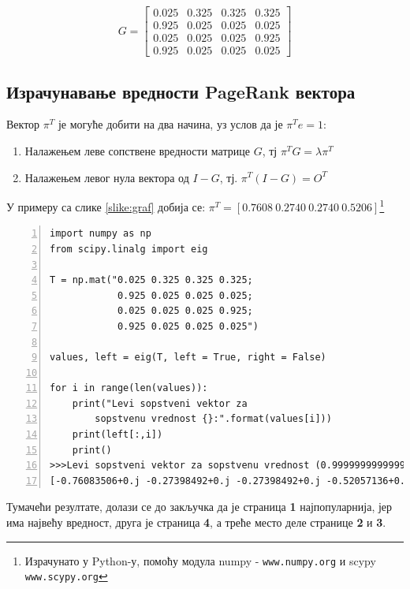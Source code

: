 \[G =
\begin{bmatrix}
0.025 & 0.325 & 0.325 & 0.325 \\
0.925 & 0.025 & 0.025 & 0.025 \\
0.025 & 0.025 & 0.025 & 0.925 \\
0.925 & 0.025 & 0.025 & 0.025
\end{bmatrix}
\]

\subsection{Израчунавање вредности PageRank\texttrademark{} вектора}

Вектор $\pi^{T}$ је могуће добити на два начина, уз услов да је $\pi^{T}e = 1$:

\begin{enumerate}
\item Налажењем леве сопствене вредности матрице $G$, тј $\pi^{T}G=\lambda \pi^{T}$
\item Налажењем левог нула вектора од $I - G$, тј. $\pi^{T}(I-G)=O^{T}$
\end{enumerate}

У примеру са слике \ref{slike:graf} добија се: $\pi^{T} = \left [0.7608\: 0.2740\: 0.2740\: 0.5206 \right ]$\footnote{Израчунато у Python-у, помоћу модула numpy - \texttt{www.numpy.org} и scypy \texttt{www.scypy.org}}

\begin{lstlisting}[caption=Израчунавање леве сопствене вредности, label={lst:eigen}, numbers=left]
import numpy as np
from scipy.linalg import eig

T = np.mat("0.025 0.325 0.325 0.325;
            0.925 0.025 0.025 0.025;
            0.025 0.025 0.025 0.925;
            0.925 0.025 0.025 0.025")

values, left = eig(T, left = True, right = False)

for i in range(len(values)):
	print("Levi sopstveni vektor za
        sopstvenu vrednost {}:".format(values[i]))
	print(left[:,i])
	print()
>>>Levi sopstveni vektor za sopstvenu vrednost (0.9999999999999998+0j):
[-0.76083506+0.j -0.27398492+0.j -0.27398492+0.j -0.52057136+0.j]
\end{lstlisting}

Тумачећи резултате, долази се до закључка да је страница \textbf{1} најпопуларнија, јер има највећу вредност, друга је страница \textbf{4}, а треће место деле странице \textbf{2} и \textbf{3}.

